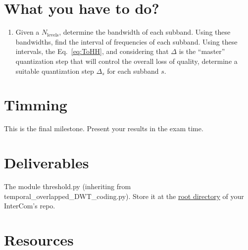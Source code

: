 \section{What you have to do?}

\begin{enumerate}
\item Given a $N_{\text{levels}}$, determine the bandwidth of each
  subband. Using these bandwidths, find the interval of frequencies of
  each subband. Using these intervals, the Eq.~\ref{eq:ToHH}, and
  considering that $\Delta$ is the ``master'' quantization step that
  will control the overall loss of quality, determine a suitable
  quantization step $\Delta_s$ for each subband $s$.
\end{enumerate}

\section{Timming}

This is the final milestone. Present your results in the exam time.

\section{Deliverables}

The module threshold.py (inheriting from temporal\_overlapped\_DWT\_coding.py). Store it at the
\href{https://github.com/Tecnologias-multimedia/intercom}{root
  directory} of your InterCom's repo.

\section{Resources}



